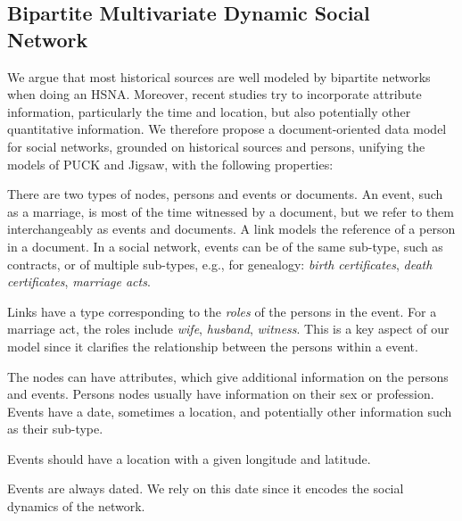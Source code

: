 \documentclass{vgtc}                          %
\begin{document}
\subsection{Bipartite Multivariate Dynamic Social Network}

We argue that most historical sources are well modeled by bipartite networks when doing an HSNA. Moreover, recent studies try to incorporate attribute information, particularly the time and location, but also potentially other quantitative information.
We therefore propose a document-oriented data model for social networks, grounded on historical sources and persons, unifying the models of PUCK and Jigsaw, with the following properties:
\begin{description}[noitemsep]
\item[{Bipartite:}] There are two types of nodes, persons and events or documents. An event, such as a marriage, is most of the time witnessed by a document, but we refer to them interchangeably as events and documents. A link models the reference of a person in a document. In a social network, events can be of the same sub-type, such as contracts, or of multiple sub-types, e.g., for genealogy: \emph{birth certificates}, \emph{death certificates}, \emph{marriage acts}.
\item[Roles:] Links have a type corresponding to the \emph{roles} of the persons in the event. For a marriage act, the roles include \emph{wife}, \emph{husband}, \emph{witness}. This is a key aspect of our model since it clarifies the relationship between the persons within a event.
\item[{Multivariate:}] The nodes can have attributes, which give additional information on the persons and events. Persons nodes usually have information on their sex or profession. Events have a date, sometimes a location, and potentially other information such as their sub-type.
\item[{Geolocated:}] Events should have a location with a given longitude and latitude. 
\item[{Dynamic:}] Events are always dated. We rely on this date since it encodes the social dynamics of the network.
\end{description}
\end{document}
